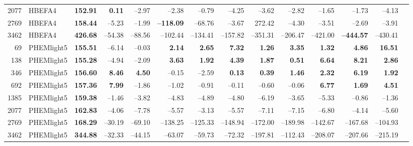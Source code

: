 \begin{table}[htb]
{\begin{tabular}{r l *{12}{r}}
      2077 & HBEFA4     & \textbf{152.91}      & \textbf{0.11}   & –2.97  & –2.38  & –0.79  & –4.25   & –3.62   & –2.82  & –1.65  & –1.73  & –4.13  \\
      2769 & HBEFA4     & \textbf{158.44}      & –5.23  & –1.99  & \textbf{–118.09} & –68.76 & –3.67   & 272.42 & –4.30  & –3.51  & –2.69  & –3.91  \\
      3462 & HBEFA4     & \textbf{426.68}      & –54.38 & –88.56 & –102.44 & –134.41 & –157.82 & –351.31 & –206.47 & –421.00 & \textbf{–444.57} & –430.41 \\
      \midrule
      69   & PHEMlight5 & \textbf{155.51}      & –6.14  & –0.03  & \textbf{2.14}   & \textbf{2.65}   & \textbf{7.32}  & \textbf{1.26}    & \textbf{3.35}   & \textbf{1.32}   & \textbf{4.86}   & \textbf{16.51} \\
      138  & PHEMlight5 & \textbf{155.28}      & –4.94  & –2.09  & \textbf{3.63}   & \textbf{1.92}   & \textbf{4.39}  & \textbf{1.87}    & \textbf{0.51}   & \textbf{6.64}   & \textbf{8.21}   & \textbf{2.86}   \\
      346  & PHEMlight5 & \textbf{156.60}      & \textbf{8.46}   & \textbf{4.50}   & –0.15  & –2.59  & \textbf{0.13}    & \textbf{0.39}    & \textbf{1.46}   & \textbf{2.32}   & \textbf{6.19}   & \textbf{1.92}   \\
      692  & PHEMlight5 & \textbf{157.36}      & \textbf{7.99}   & –1.86  & –1.02  & –0.91  & –0.11   & –0.60 & –0.06  & \textbf{6.77}   & \textbf{1.69}   & \textbf{4.51}  \\
      1385 & PHEMlight5 & \textbf{159.38}      & –1.46  & –3.82  & –4.83  & –4.89  & –4.80   & –6.19   & –3.65  & –5.33  & –0.86  & –1.36  \\
      2077 & PHEMlight5 & \textbf{162.83}      & –4.06  & –7.78  & –5.57  & –3.13  & –5.57   & –7.11   & –7.15  & –6.80  & –4.14  & –5.60  \\
      2769 & PHEMlight5 & \textbf{168.29}      & –30.19 & –69.10 & –138.25 & –125.33 & –148.94 & –172.00  & –189.98 & –142.67 & –167.68 & –104.93 \\
      3462 & PHEMlight5 & \textbf{344.88}      & –32.33 & –44.15 & –63.07  & –59.73  & –72.32  & –197.81  & –112.43 & –208.07 & –207.66 & –215.19 \\
      \bottomrule
    \end{tabular}%
  }
\end{table}

